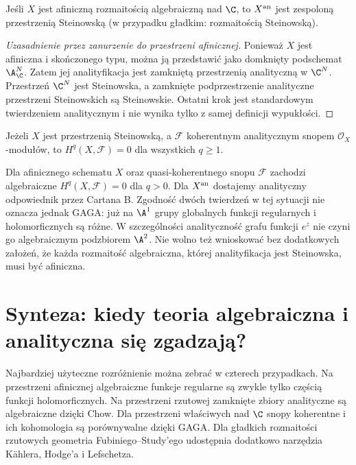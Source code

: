 \begin{twierdzenie}
\label{tw:ga9-affine-stein}
Jeśli $X$ jest afiniczną rozmaitością algebraiczną
nad $\C$, to $X^{\rm an}$ jest zespoloną
przestrzenią Steinowską (w przypadku gładkim:
rozmaitością Steinowską).
\end{twierdzenie}
\begin{proof}[Uzasadnienie przez zanurzenie do przestrzeni afinicznej]
Ponieważ $X$ jest afiniczna i skończonego typu,
można ją przedstawić jako domknięty podschemat
$\A^N_\C$. Zatem jej analityfikacja jest
zamkniętą przestrzenią analityczną w $\C^N$.
Przestrzeń $\C^N$ jest Steinowska, a zamknięte
podprzestrzenie analityczne przestrzeni Steinowskich
są Steinowskie. Ostatni krok jest standardowym
twierdzeniem analitycznym i nie wynika tylko
z samej definicji wypukłości.
\end{proof}

\begin{twierdzenie}
Jeżeli $X$ jest przestrzenią Steinowską,
a $\mathcal F$ koherentnym analitycznym snopem
$\mathcal O_X$-modułów, to
$H^q(X,\mathcal F)=0$ dla wszystkich $q\ge1$.
\end{twierdzenie}

\begin{uwaga}
Dla afinicznego schematu $X$ oraz quasi-koherentnego
snopu $\mathcal F$ zachodzi algebraiczne
$H^q(X,\mathcal F)=0$ dla $q>0$. Dla $X^{\rm an}$
dostajemy analityczny odpowiednik przez Cartana B.
Zgodność dwóch twierdzeń w tej sytuacji nie oznacza
jednak GAGA: już na $\A^1$ grupy globalnych funkcji
regularnych i holomorficznych są różne.
W szczególności analityczność grafu funkcji $e^z$
nie czyni go algebraicznym podzbiorem $\A^2$.
Nie wolno też wnioskować bez dodatkowych założeń,
że każda rozmaitość algebraiczna, której analityfikacja
jest Steinowska, musi być afiniczna.
\end{uwaga}

\section{Synteza: kiedy teoria algebraiczna i analityczna się zgadzają?}
\label{sec:ga9-podsumowanie}

Najbardziej użyteczne rozróżnienie można zebrać
w czterech przypadkach. Na przestrzeni afinicznej
algebraiczne funkcje regularne są zwykle tylko częścią
funkcji holomorficznych. Na przestrzeni rzutowej
zamknięte zbiory analityczne są algebraiczne dzięki
Chow. Dla przestrzeni właściwych nad $\C$ snopy
koherentne i ich kohomologia są porównywalne dzięki
GAGA. Dla gładkich rozmaitości rzutowych geometria
Fubiniego--Study'ego udostępnia dodatkowo narzędzia
Kählera, Hodge'a i Lefschetza.

